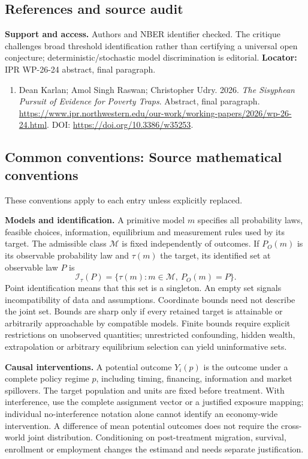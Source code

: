 \documentclass[11pt,a4paper]{article}
\begin{document}
\subsection*{References and source audit}
\textbf{Support and access.} Authors and NBER identifier checked. The critique challenges broad threshold identification rather than certifying a universal open conjecture; deterministic/stochastic model discrimination is editorial. \textbf{Locator:} IPR WP-26-24 abstract, final paragraph.
\begin{enumerate}\raggedright
\item\hypertarget{definitions:source:30007652:1}{} Dean Karlan; Amol Singh Raswan; Christopher Udry. 2026. \emph{The Sisyphean Pursuit of Evidence for Poverty Traps}. Abstract, final paragraph.
\url{https://www.ipr.northwestern.edu/our-work/working-papers/2026/wp-26-24.html}.
DOI: \url{https://doi.org/10.3386/w35253}.
\end{enumerate}

\subsection*{Common conventions: Source mathematical conventions}

These conventions apply to each entry unless explicitly replaced.

\textbf{Models and identification.} A primitive model \(m\) specifies all probability laws, feasible choices, information, equilibrium and measurement rules used by its target. The admissible class \(\mathcal M\) is fixed independently of outcomes. If \(P_O(m)\) is its observable probability law and \(\tau(m)\) the target, its identified set at observable law \(P\) is
\[
 \mathcal I_\tau(P)=\{\tau(m):m\in\mathcal M,\ P_O(m)=P\}.
\]
Point identification means that this set is a singleton. An empty set signals incompatibility of data and assumptions. Coordinate bounds need not describe the joint set. Bounds are sharp only if every retained target is attainable or arbitrarily approachable by compatible models. Finite bounds require explicit restrictions on unobserved quantities; unrestricted confounding, hidden wealth, extrapolation or arbitrary equilibrium selection can yield uninformative sets.

\textbf{Causal interventions.} A potential outcome \(Y_i(p)\) is the outcome under a complete policy regime \(p\), including timing, financing, information and market spillovers. The target population and units are fixed before treatment. With interference, use the complete assignment vector or a justified exposure mapping; individual no-interference notation alone cannot identify an economy-wide intervention. A difference of mean potential outcomes does not require the cross-world joint distribution. Conditioning on post-treatment migration, survival, enrollment or employment changes the estimand and needs separate justification.
\end{document}
